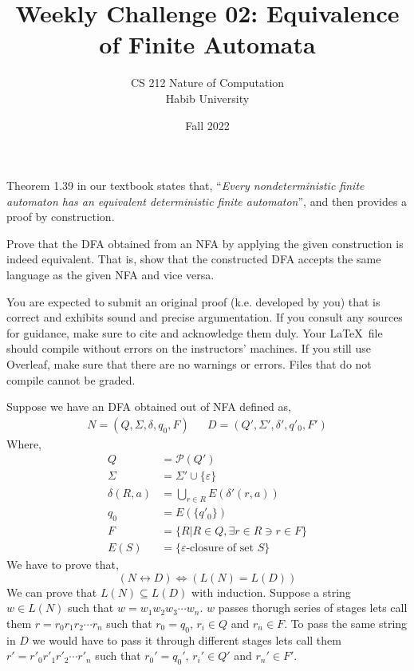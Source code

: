 \documentclass[a4paper]{exam}
\title{Weekly Challenge 02: Equivalence of Finite Automata}
\author{CS 212 Nature of Computation\\Habib University}
\date{Fall 2022}
\begin{document}
\maketitle

\begin{questions}


	Theorem 1.39 in our textbook states that, ``\emph{Every nondeterministic finite automaton has an equivalent deterministic finite automaton}'', and then provides a proof by construction.

	Prove that the DFA obtained from an NFA by applying the given construction is indeed equivalent. That is, show that the constructed DFA accepts the same language as the given NFA and vice versa.

	You are expected to submit an original proof (k.e. developed by you) that is correct and exhibits sound and precise argumentation. If you consult any sources for guidance, make sure to cite and acknowledge them duly. Your \LaTeX\ file should compile without errors on the instructors' machines. If you still use Overleaf, make sure that there are no warnings or errors. Files that do not compile cannot be graded.


	\begin{solution}
		Suppose we have an DFA obtained out of NFA defined as,
		\begin{align}
			N=(Q,\Sigma, \delta, q_0, F) &  & D=(Q',\Sigma', \delta', q'_0, F')
		\end{align}
		Where,
		\begin{equation*}
			\begin{split}
				Q&=\mathcal{P}(Q')\\
				\Sigma&=\Sigma'\cup\{\varepsilon\}\\
				\delta(R,a)&=\bigcup_{r\in R}E(\delta'(r,a))\\
				q_0&=E(\{q'_0\})\\
				F&=\{R|R\in Q, \exists r\in R \ni r\in F\}\\
				E(S)&=\{\varepsilon\text{-closure of set }S\}
			\end{split}
		\end{equation*}
		We have to prove that,
		\[(N\longleftrightarrow D)\iff (L(N)=L(D))\]
		We can prove that \(L(N)\subseteq L(D)\) with induction. Suppose a string \(w\in L(N)\) such that \(w=w_1w_2w_3\cdots w_n\). \(w\) passes thorugh series of stages lets call them \(r=r_0r_1r_2\cdots r_n\) such that \(r_0=q_0\), \(r_i\in Q\) and \(r_n\in F\). To pass the same string in \(D\) we would have to pass it through different stages lets call them \(r'=r'_0r'_1r'_2\cdots r'_n\) such that \(r_0'=q_0'\), \(r_i'\in Q'\) and \(r_n'\in F'\).


\end{solution}
\end{questions}
\end{document}
